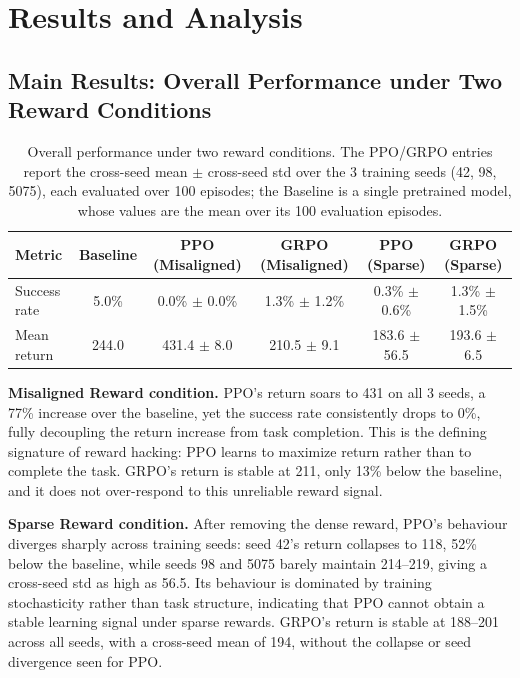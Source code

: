 \chapter{Results and Analysis} \label{Chap4}

\section{Main Results: Overall Performance under Two Reward Conditions}

\begin{table}[h]
\centering
\begin{tabular}{lccccc}
\hline
Metric & Baseline & PPO (Misaligned) & GRPO (Misaligned) & PPO (Sparse) & GRPO (Sparse) \\
\hline
Success rate & 5.0\% & 0.0\% $\pm$ 0.0\% & 1.3\% $\pm$ 1.2\% & 0.3\% $\pm$ 0.6\% & 1.3\% $\pm$ 1.5\% \\
Mean return & 244.0 & 431.4 $\pm$ 8.0 & 210.5 $\pm$ 9.1 & 183.6 $\pm$ 56.5 & 193.6 $\pm$ 6.5 \\
\hline
\end{tabular}
\caption{Overall performance under two reward conditions. The PPO/GRPO entries report the cross-seed mean $\pm$ cross-seed std over the 3 training seeds (42, 98, 5075), each evaluated over 100 episodes; the Baseline is a single pretrained model, whose values are the mean over its 100 evaluation episodes.}
\label{tab:main}
\end{table}

\textbf{Misaligned Reward condition.} PPO's return soars to 431 on all 3 seeds, a 77\% increase over the baseline, yet the success rate consistently drops to 0\%, fully decoupling the return increase from task completion. This is the defining signature of reward hacking: PPO learns to maximize return rather than to complete the task. GRPO's return is stable at 211, only 13\% below the baseline, and it does not over-respond to this unreliable reward signal.

\textbf{Sparse Reward condition.} After removing the dense reward, PPO's behaviour diverges sharply across training seeds: seed 42's return collapses to 118, 52\% below the baseline, while seeds 98 and 5075 barely maintain 214--219, giving a cross-seed std as high as 56.5. Its behaviour is dominated by training stochasticity rather than task structure, indicating that PPO cannot obtain a stable learning signal under sparse rewards. GRPO's return is stable at 188--201 across all seeds, with a cross-seed mean of 194, without the collapse or seed divergence seen for PPO.

